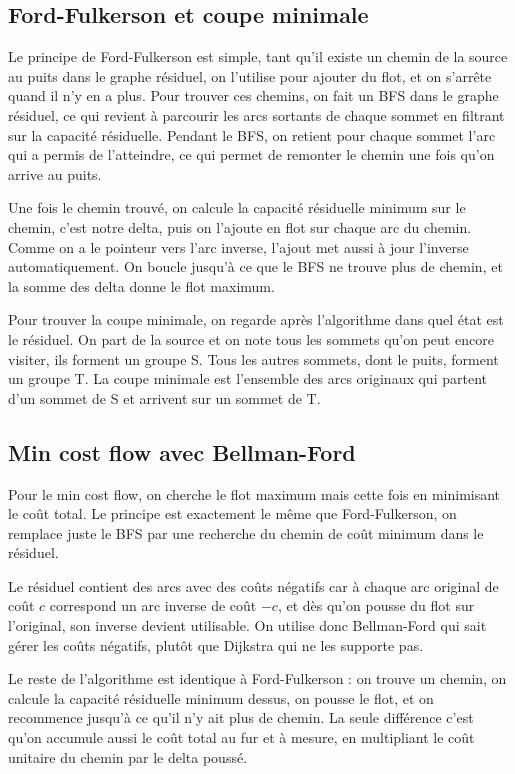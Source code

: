 \documentclass[11pt,a4paper]{article}
\begin{document}
\subsection{Ford-Fulkerson et coupe minimale}

Le principe de Ford-Fulkerson est simple, tant qu'il existe un chemin de la source au puits dans le graphe résiduel, on l'utilise pour ajouter du flot, et on s'arrête quand il n'y en a plus. Pour trouver ces chemins, on fait un BFS dans le graphe résiduel, ce qui revient à parcourir les arcs sortants de chaque sommet en filtrant sur la capacité résiduelle. Pendant le BFS, on retient pour chaque sommet l'arc qui a permis de l'atteindre, ce qui permet de remonter le chemin une fois qu'on arrive au puits.

Une fois le chemin trouvé, on calcule la capacité résiduelle minimum sur le chemin, c'est notre delta, puis on l'ajoute en flot sur chaque arc du chemin. Comme on a le pointeur vers l'arc inverse, l'ajout met aussi à jour l'inverse automatiquement. On boucle jusqu'à ce que le BFS ne trouve plus de chemin, et la somme des delta donne le flot maximum.

Pour trouver la coupe minimale, on regarde après l'algorithme dans quel état est le résiduel. On part de la source et on note tous les sommets qu'on peut encore visiter, ils forment un groupe S. Tous les autres sommets, dont le puits, forment un groupe T. La coupe minimale est l'ensemble des arcs originaux qui partent d'un sommet de S et arrivent sur un sommet de T.


\subsection{Min cost flow avec Bellman-Ford}

Pour le min cost flow, on cherche le flot maximum mais cette fois en minimisant le coût total. Le principe est exactement le même que Ford-Fulkerson, on remplace juste le BFS par une recherche du chemin de coût minimum dans le résiduel.

Le résiduel contient des arcs avec des coûts négatifs car à chaque arc original de coût $c$ correspond un arc inverse de coût $-c$, et dès qu'on pousse du flot sur l'original, son inverse devient utilisable. On utilise donc Bellman-Ford qui sait gérer les coûts négatifs, plutôt que Dijkstra qui ne les supporte pas.

Le reste de l'algorithme est identique à Ford-Fulkerson : on trouve un chemin, on calcule la capacité résiduelle minimum dessus, on pousse le flot, et on recommence jusqu'à ce qu'il n'y ait plus de chemin. La seule différence c'est qu'on accumule aussi le coût total au fur et à mesure, en multipliant le coût unitaire du chemin par le delta poussé.
\end{document}
